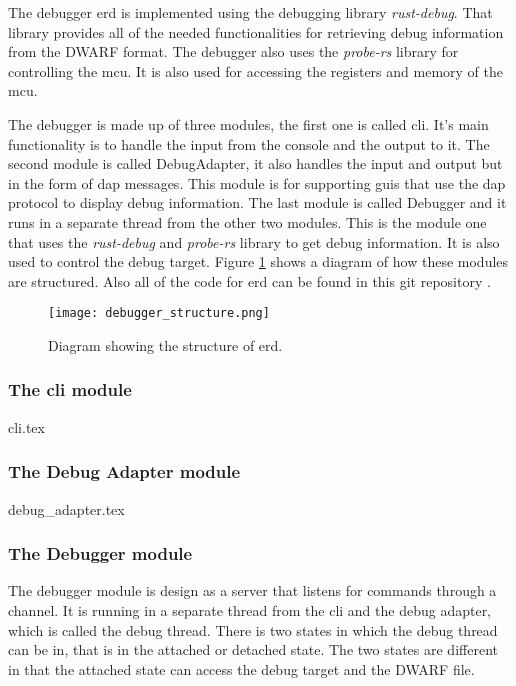 The debugger \acrfull{erd} is implemented using the debugging library \emph{rust-debug}.
That library provides all of the needed functionalities for retrieving debug information from the \gls{DWARF} format.
The debugger also uses the \emph{probe-rs} library for controlling the \gls{mcu}.
It is also used for accessing the registers and memory of the \gls{mcu}.


The debugger is made up of three modules, the first one is called \acrshort{cli}.
It's main functionality is to handle the input from the console and the output to it.
The second module is called DebugAdapter, it also handles the input and output but in the form of \gls{dap} messages.
This module is for supporting \glspl{gui} that use the \gls{dap} protocol to display debug information.
The last module is called Debugger and it runs in a separate thread from the other two modules.
This is the module one that uses the \emph{rust-debug} and \emph{probe-rs} library to get debug information.
It is also used to control the debug target.
Figure \ref{fig:ERDStruct} shows a diagram of how these modules are structured.
Also all of the code for \gls{erd} can be found in this git repository \cite{erd}.


\begin{figure}[h]
	\centering
	\texttt{[image: debugger\_structure.png]}
	\caption{Diagram showing the structure of  \acrfull{erd}.}
	\label{fig:ERDStruct}
\end{figure}


\subsubsection{The \acrshort{cli} module}
{cli.tex}


\subsubsection{The Debug Adapter module}
{debug_adapter.tex}


\subsubsection{The Debugger module}
The debugger module is design as a server that listens for commands through a channel.
It is running in a separate thread from the \acrshort{cli} and the debug adapter, which is called the debug thread.
There is two states in which the debug thread can be in, that is in the attached or detached state.
The two states are different in that the attached state can access the debug target and the \gls{DWARF} file.


